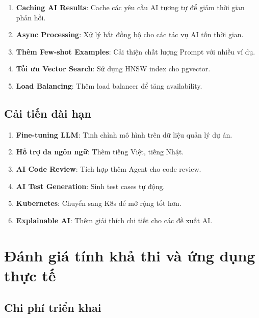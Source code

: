 \documentclass[12pt,a4paper]{report}
\begin{document}
\begin{enumerate}
\item \textbf{Caching AI Results}: Cache các yêu cầu AI tương tự để giảm thời gian phản hồi.
\item \textbf{Async Processing}: Xử lý bất đồng bộ cho các tác vụ AI tốn thời gian.
\item \textbf{Thêm Few-shot Examples}: Cải thiện chất lượng Prompt với nhiều ví dụ.
\item \textbf{Tối ưu Vector Search}: Sử dụng HNSW index cho pgvector.
\item \textbf{Load Balancing}: Thêm load balancer để tăng availability.
\end{enumerate}

\subsection{Cải tiến dài hạn}

\begin{enumerate}
\item \textbf{Fine-tuning LLM}: Tinh chỉnh mô hình trên dữ liệu quản lý dự án.
\item \textbf{Hỗ trợ đa ngôn ngữ}: Thêm tiếng Việt, tiếng Nhật.
\item \textbf{AI Code Review}: Tích hợp thêm Agent cho code review.
\item \textbf{AI Test Generation}: Sinh test cases tự động.
\item \textbf{Kubernetes}: Chuyển sang K8s để mở rộng tốt hơn.
\item \textbf{Explainable AI}: Thêm giải thích chi tiết cho các đề xuất AI.
\end{enumerate}

\section{Đánh giá tính khả thi và ứng dụng thực tế}

\subsection{Chi phí triển khai}
\end{document}
